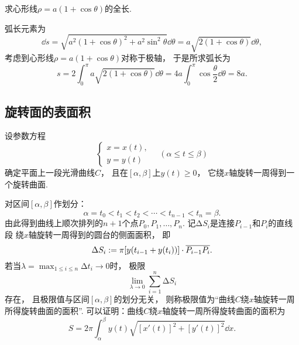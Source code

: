 \begin{example}
求心形线\(\rho=a(1+\cos\theta)\)的全长.
\begin{solution}
弧长元素为\begin{equation*}
	\dd{s} = \sqrt{a^2(1+\cos\theta)^2+a^2\sin^2\theta} \dd{\theta}
	= a \sqrt{2(1+\cos\theta)} \dd{\theta},
\end{equation*}
考虑到心形线\(\rho=a(1+\cos\theta)\)对称于极轴，
于是所求弧长为\begin{equation*}
	s = 2 \int_0^\pi a \sqrt{2(1+\cos\theta)} \dd{\theta}
	= 4a \int_0^\pi \cos\frac\theta2 \dd{\theta}
	= 8a.
\end{equation*}
\end{solution}
\end{example}

\subsection{旋转面的表面积}
设参数方程\begin{equation*}
	\left\{ \begin{array}{l}
		x = x(t), \\
		y = y(t)
	\end{array} \right.
	\quad(\alpha \leq t \leq \beta)
\end{equation*}确定平面上一段光滑曲线\(C\)，
且在\([\alpha,\beta]\)上\(y(t) \geq 0\)，
它绕\(x\)轴旋转一周得到一个旋转曲面.

对区间\([\alpha,\beta]\)作划分：\begin{equation*}
	\alpha = t_0 < t_1 < t_2 < \dotsb < t_{n-1} < t_n = \beta.
\end{equation*}
由此得到曲线上顺次排列的\(n+1\)个点\(P_0,P_1,\dotsc,P_n\).
记\(\increment S_i\)是连接\(P_{i-1}\)和\(P_i\)的直线段
绕\(x\)轴旋转一周得到的圆台的侧面面积，
即\begin{equation*}
	\Delta S_i
	:=
	\pi [y(t_{i-1} + y(t_i))] \cdot \overline{P_{i-1} P_i}.
\end{equation*}
若当\(\lambda=\max_{1 \leq i \leq n} \increment t_i \to 0\)时，
极限\begin{equation*}
	\lim_{\lambda\to0} \sum_{i=1}^n \increment S_i
\end{equation*}存在，
且极限值与区间\([\alpha,\beta]\)的划分无关，
则称极限值为“曲线\(C\)绕\(x\)轴旋转一周所得旋转曲面的面积”.
可以证明：曲线\(C\)绕\(x\)轴旋转一周所得旋转曲面的面积为\begin{equation}
	S = 2\pi \int_\alpha^\beta y(t) \sqrt{[x'(t)]^2 + [y'(t)]^2} \dd{x}.
\end{equation}

